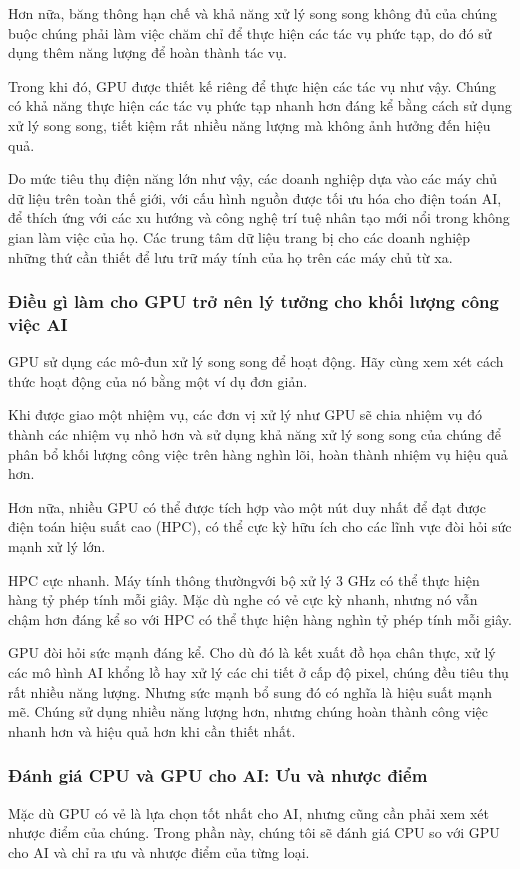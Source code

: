 \documentclass[a4paper]{article}
\begin{document}
Hơn nữa, băng thông hạn chế và khả năng xử lý song song không đủ của chúng buộc chúng phải làm việc chăm chỉ để thực hiện các tác vụ phức tạp, do đó sử dụng thêm năng lượng để hoàn thành tác vụ.

Trong khi đó, GPU được thiết kế riêng để thực hiện các tác vụ như vậy. Chúng có khả năng thực hiện các tác vụ phức tạp nhanh hơn đáng kể bằng cách sử dụng xử lý song song, tiết kiệm rất nhiều năng lượng mà không ảnh hưởng đến hiệu quả.

Do mức tiêu thụ điện năng lớn như vậy, các doanh nghiệp dựa vào các máy chủ dữ liệu trên toàn thế giới, với cấu hình nguồn được tối ưu hóa cho điện toán AI, để thích ứng với các xu hướng và công nghệ trí tuệ nhân tạo mới nổi trong không gian làm việc của họ. Các trung tâm dữ liệu trang bị cho các doanh nghiệp những thứ cần thiết để lưu trữ máy tính của họ trên các máy chủ từ xa.

\subsubsection{Điều gì làm cho GPU trở nên lý tưởng cho khối lượng công việc AI}

GPU sử dụng các mô-đun xử lý song song để hoạt động. Hãy cùng xem xét cách thức hoạt động của nó bằng một ví dụ đơn giản.

Khi được giao một nhiệm vụ, các đơn vị xử lý như GPU sẽ chia nhiệm vụ đó thành các nhiệm vụ nhỏ hơn và sử dụng khả năng xử lý song song của chúng để phân bổ khối lượng công việc trên hàng nghìn lõi, hoàn thành nhiệm vụ hiệu quả hơn.

Hơn nữa, nhiều GPU có thể được tích hợp vào một nút duy nhất để đạt được điện toán hiệu suất cao (HPC), có thể cực kỳ hữu ích cho các lĩnh vực đòi hỏi sức mạnh xử lý lớn.

HPC cực nhanh. Máy tính thông thườngvới bộ xử lý 3 GHz có thể thực hiện hàng tỷ phép tính mỗi giây. Mặc dù nghe có vẻ cực kỳ nhanh, nhưng nó vẫn chậm hơn đáng kể so với HPC có thể thực hiện hàng nghìn tỷ phép tính mỗi giây.

GPU đòi hỏi sức mạnh đáng kể. Cho dù đó là kết xuất đồ họa chân thực, xử lý các mô hình AI khổng lồ hay xử lý các chi tiết ở cấp độ pixel, chúng đều tiêu thụ rất nhiều năng lượng. Nhưng sức mạnh bổ sung đó có nghĩa là hiệu suất mạnh mẽ. Chúng sử dụng nhiều năng lượng hơn, nhưng chúng hoàn thành công việc nhanh hơn và hiệu quả hơn khi cần thiết nhất.

\subsubsection{Đánh giá CPU và GPU cho AI: Ưu và nhược điểm}
Mặc dù GPU có vẻ là lựa chọn tốt nhất cho AI, nhưng cũng cần phải xem xét nhược điểm của chúng. Trong phần này, chúng tôi sẽ đánh giá CPU so với GPU cho AI và chỉ ra ưu và nhược điểm của từng loại.
\end{document}

